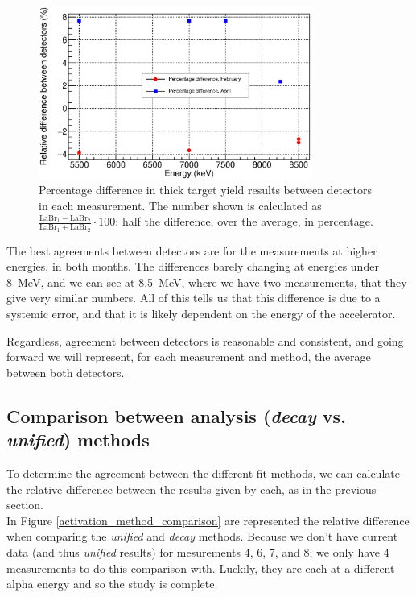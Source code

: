 \documentclass[a4paper,12pt]{report}
\begin{document}
\begin{figure}[H]
	\centering
	\includegraphics[width=0.80\textwidth]{decay_errors_rel_per_fixed.eps}	%
	\caption{Percentage difference in thick target yield results between detectors in each measurement.
	The number shown is calculated as $\frac{\text{LaBr}_1-\text{LaBr}_2}{\text{LaBr}_1+\text{LaBr}_2}\cdot 100$: half the difference, over the average, in percentage.}
	\label{decay_errors_rel_per_fixed}
\end{figure}

The best agreements between detectors are for the measurements at higher energies, in both months.
The differences barely changing at energies under \qty{8}{\MeV}, and we can see at \qty{8.5}{\MeV}, where we have two measurements, that they give very similar numbers.
All of this tells us that this difference is due to a systemic error, and that it is likely dependent on the energy of the accelerator.

Regardless, agreement between detectors is reasonable and consistent, and going forward we will represent, for each measurement and method, the average between both detectors.

\subsection{Comparison between analysis (\textit{decay} vs. \textit{unified}) methods}
To determine the agreement between the different fit methods, we can calculate the relative difference between the results given by each, as in the previous section.
\\

In Figure \ref{activation_method_comparison} are represented the relative difference when comparing the \textit{unified} and \textit{decay} methods.
Because we don't have current data (and thus \textit{unified} results) for mesurements 4, 6, 7, and 8; we only have 4 measurements to do this comparison with.
Luckily, they are each at a different alpha energy and so the study is complete.
\end{document}
